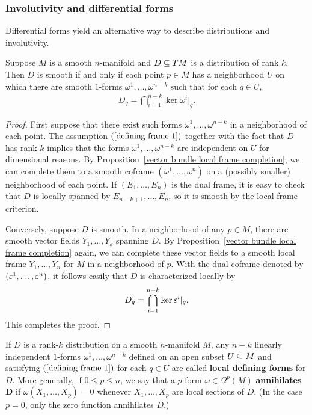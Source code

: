 \subsubsection{Involutivity and differential forms}
Differential forms yield an alternative way to describe distributions and involutivity.
\begin{lemma}\label{distribution smooth crit}
Suppose $M$ is a smooth $n$-manifold and $D\subseteq TM$ is a distribution of rank $k$. Then $D$ is smooth if and only if each point $p\in M$ has a neighborhood $U$ on which there are smooth $1$-forms $\omega^1,\dots,\omega^{n-k}$ such that for each $q\in U$,
\begin{align}\label{defining frame-1}
D_q=\bigcap_{i=1}^{n-k}\ker\omega^i|_q.
\end{align}
\end{lemma}
\begin{proof}
First suppose that there exist such forms $\omega^1,\dots,\omega^{n-k}$ in a neighborhood of each point. The assumption $(\ref{defining frame-1})$ together with the fact that $D$ has rank $k$ implies that the forms $\omega^1,\dots,\omega^{n-k}$ are independent on $U$ for dimensional reasons. By Proposition~\ref{vector bundle local frame completion}, we can complete them to a smooth coframe $(\omega^1,\dots,\omega^n)$ on a (possibly smaller) neighborhood of each point. If $(E_1,\dots,E_n)$ is the dual frame, it is easy to check that $D$ is locally spanned by $E_{n-k+1},\dots,E_n$, so it is smooth by the local frame criterion.\par
Conversely, suppose $D$ is smooth. In a neighborhood of any $p\in M$, there are smooth vector fields $Y_1,\dots,Y_k$ spanning $D$. By Proposition~\ref{vector bundle local frame completion} again, we can complete these vector fields to a smooth local frame $Y_1,\dots,Y_n$ for $M$ in a neighborhood of $p$. With the dual coframe denoted by $(\varepsilon^1,\dots,\varepsilon^n)$, it follows easily that $D$ is characterized locally by
\[D_q=\bigcap_{i=1}^{n-k}\ker\varepsilon^i|_q.\]
This completes the proof.
\end{proof}
If $D$ is a rank-$k$ distribution on a smooth $n$-manifold $M$, any $n-k$ linearly independent $1$-forms $\omega^1,\dots,\omega^{n-k}$ defined on an open subset $U\subseteq M$ and satisfying $(\ref{defining frame-1})$ for each $q\in U$ are called \textbf{local defining forms} for $D$. More generally, if $0\leq p\leq n$, we say that a $p$-form $\omega\in\Omega^p(M)$ \textbf{annihilates $\bm{D}$} if $\omega(X_1,\dots,X_p)=0$ whenever $X_1,\dots,X_p$ are local sections of $D$. (In the case $p=0$, only the zero function annihilates $D$.)
